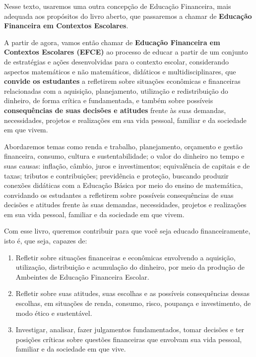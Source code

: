 Nesse texto, usaremos uma outra concepção de Educação Financeira, mais adequada aos propósitos do livro aberto, que passaremos a chamar de \textbf{Educação Financeira em Contextos Escolares}.

A partir de agora, vamos então chamar de \textbf{Educação Financeira em Contextos Escolares (EFCE)} ao processo de educar a partir de um conjunto de estratégias e ações desenvolvidas para o contexto escolar, considerando aspectos matemáticos e não matemáticos, didáticos e multidisciplinares, que \textbf{convide os estudantes} a refletirem sobre situações econômicas e financeiras relacionadas com a aquisição, planejamento, utilização e redistribuição do dinheiro, de forma crítica e fundamentada, e também sobre possíveis \textbf{consequências de suas decisões e atitudes} frente às suas demandas, necessidades, projetos e realizações em sua vida pessoal, familiar e da sociedade em que vivem.

Abordaremos temas como renda e trabalho, planejamento, orçamento e gestão financeira, consumo, cultura e sustentabilidade; o valor do dinheiro no tempo e suas causas: inflação, câmbio, juros e investimentos; equivalência de capitais e de taxas; tributos e contribuições; previdência e proteção, buscando produzir conexões didáticas com a Educação Básica por meio do ensino de matemática, convidando os estudantes a refletirem sobre possíveis consequências de suas decisões e atitudes frente às suas demandas, necessidades, projetos e realizações em sua vida pessoal, familiar e da sociedade em que vivem.

Com esse livro, queremos contribuir para que você seja educado financeiramente, isto é, que seja, capazes de:

\begin{enumerate}[label=\arabic*.]

\item Refletir sobre situações financeiras e econômicas envolvendo a aquisição, utilização, distribuição e acumulação do dinheiro, por meio da produção de Ambeintes de Educação Financeira Escolar.

\item Refletir sobre suas atitudes, suas escolhas e as possíveis consequências dessas escolhas, em situações de renda, consumo, risco, poupança e investimento, de modo ético e sustentável. 

\item Investigar, analisar, fazer julgamentos fundamentados, tomar decisões e ter posições críticas sobre questões financeiras que envolvam sua vida pessoal, familiar e da sociedade em que vive.

\end{enumerate}

